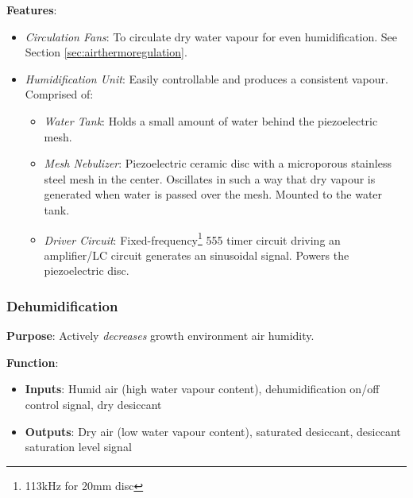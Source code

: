 \textbf{Features}:
\begin{itemize}
    \item \textit{Circulation Fans}: To circulate dry water vapour for even humidification. See Section \ref{sec:airthermoregulation}.
    \item \textit{Humidification Unit}: Easily controllable and produces a consistent vapour. Comprised of:
    \begin{itemize}
        \item \textit{Water Tank}: Holds a small amount of water behind the piezoelectric mesh.
        \item \textit{Mesh Nebulizer}: Piezoelectric ceramic disc with a microporous stainless steel mesh in the center. Oscillates in such a way that dry vapour is generated when water is passed over the mesh. Mounted to the water tank.
        \item \textit{Driver Circuit}: Fixed-frequency\footnote{113kHz for 20mm disc} 555 timer circuit driving an amplifier/LC circuit generates an sinusoidal signal. Powers the piezoelectric disc.
    \end{itemize}
\end{itemize}

\clearpage

\subsubsection{Dehumidification}
\label{sec:dehumidification}

\textbf{Purpose}: Actively \textit{decreases} growth environment air humidity.

\textbf{Function}:
\begin{itemize}
    \item \textbf{Inputs}: Humid air (high water vapour content), dehumidification on/off control signal, dry desiccant
    \item \textbf{Outputs}: Dry air (low water vapour content), saturated desiccant, desiccant saturation level signal
\end{itemize}

